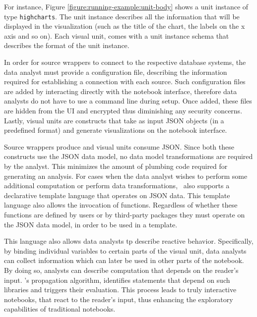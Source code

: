 {For instance, Figure \ref{figure:running-example:unit-body} shows a unit instance of type \texttt{highcharts}. The unit instance describes all the information that will be displayed in the visualization (such as the title of the chart, the labels on the x axis and so on). Each visual unit, comes with a unit instance schema that describes the format of the unit instance.




In order for source wrappers to connect to the respective database systems, the data analyst must provide a configuration file, describing the information required for establishing a connection with each source. Such configuration files are added by interacting directly with the notebook interface, therefore data analysts do not have to use a command line during setup. Once added, these files are hidden from the UI and encrypted thus diminishing any security concerns. Lastly, visual units are constructs that take as input JSON objects (in a predefined format) and generate visualizations on the notebook interface. 


Source wrappers produce and visual units consume JSON. Since both these constructs use the JSON data model, no data model transformations are required by the analyst. This minimizes the amount of plumbing code required for generating an analysis. For cases when the data analyst wishes to perform some additional computation or perform data transformations, \projname\ also supports a declarative template language that operates on JSON data. This template language also allows the invocation of functions. Regardless of whether these functions are defined by users or by third-party packages they must operate on the JSON data model, in order to be used in a template.

This language also allows data analysts tp describe reactive behavior. Specifically, by binding individual variables to certain parts of the visual unit, data analysts can collect information which can later be used in other parts of the notebook. By doing so, analysts can describe computation that depends on the reader's input. \projname's propagation algorithm, identifies statements that depend on such libraries and triggers their evaluation. This process leads to truly interactive notebooks, that react to the reader's input, thus enhancing the exploratory capabilities of traditional notebooks.
}
